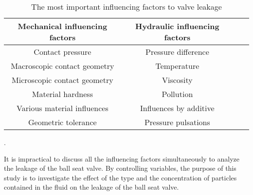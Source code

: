     \begin{table}[h!]
        \centering
        \begin{tabular}{|c| c |c |c|} 
         \hline
         Mechanical influencing factors & Hydraulic influencing factors  \\ [0.5ex] 
         \hline
         Contact pressure  & Pressure difference  \\ 
         Macroscopic contact geometry & Temperature  \\
         Microscopic contact geometry & Viscosity \\
         Material hardness & Pollution \\
         Various material influences & Influences by additive \\
         Geometric tolerance & Pressure pulsations\\[1ex] 
         \hline
        \end{tabular}
        \caption{The most important influencing factors to valve leakage \cite{PhD-M.S}}.
        \label{tab:influencing factors to valve}
        \end{table}

        It is impractical to discuss all the influencing factors simultaneously to analyze 
        the leakage of the ball seat valve. By controlling variables, the purpose of this study
         is to investigate the effect of the type and the 
        concentration of particles contained in the fluid on the leakage of the ball seat valve.
